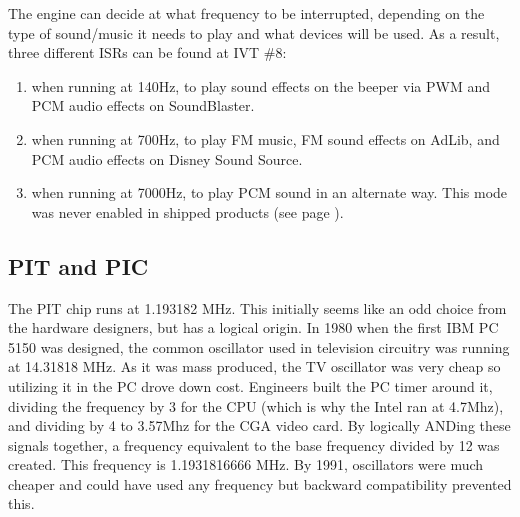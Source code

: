 \par
The engine can decide at what frequency to be interrupted, depending on the type of sound/music it needs to play and what devices will be used. As a result, three different ISRs can be found at IVT \#8: 
\begin{enumerate}
\item {} when running at 140Hz, to play sound effects on the beeper via PWM and PCM audio effects on SoundBlaster.
\item {} when running at 700Hz, to play FM music, FM sound effects on AdLib, and PCM audio effects on Disney Sound Source.
\item {} when running at 7000Hz, to play PCM sound in an alternate way. This mode was never enabled in shipped products (see page \pageref{pcs_pcm}).
\end{enumerate}
\par



\subsection{PIT and PIC}
The PIT chip runs at 1.193182 MHz. This initially seems like an odd choice from the hardware designers, but has a logical origin. In 1980 when the first IBM PC 5150 was designed, the common oscillator used in television circuitry was running at 14.31818 MHz. As it was mass produced, the TV oscillator was very cheap so utilizing it in the PC drove down cost. Engineers built the PC timer around it, dividing the frequency by 3 for the CPU (which is why the Intel ran at 4.7Mhz), and dividing by 4 to 3.57Mhz for the CGA video card. By logically ANDing these signals together, a frequency equivalent to the base frequency divided by 12 was created. This frequency is 1.1931816666 MHz. By 1991, oscillators were much cheaper and could have used any frequency but backward compatibility prevented this.\\
\par














